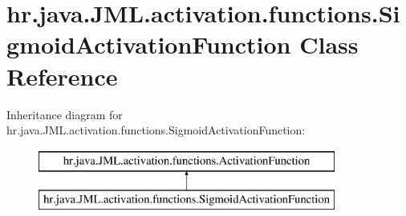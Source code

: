 \hypertarget{classhr_1_1java_1_1_j_m_l_1_1activation_1_1functions_1_1_sigmoid_activation_function}{\section{hr.\+java.\+J\+M\+L.\+activation.\+functions.\+Sigmoid\+Activation\+Function Class Reference}
\label{classhr_1_1java_1_1_j_m_l_1_1activation_1_1functions_1_1_sigmoid_activation_function}
}
Inheritance diagram for hr.\+java.\+J\+M\+L.\+activation.\+functions.\+Sigmoid\+Activation\+Function\+:\begin{figure}[H]
\begin{center}
\leavevmode
\includegraphics[height=2.000000cm]{classhr_1_1java_1_1_j_m_l_1_1activation_1_1functions_1_1_sigmoid_activation_function}
\end{center}
\end{figure}
